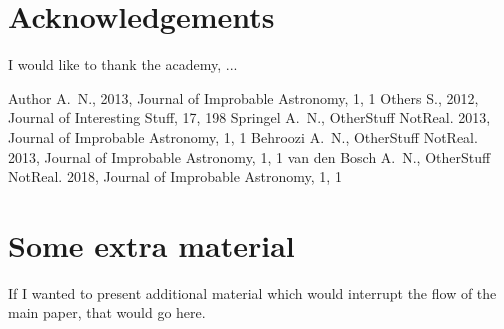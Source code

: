 \documentclass[fleqn,usenatbib]{mnras}
\begin{document}
\section*{Acknowledgements}

I would like to thank the academy, ...




%


\begin{thebibliography}{99}
Author A.~N., 2013, Journal of Improbable Astronomy, 1, 1
Others S., 2012, Journal of Interesting Stuff, 17, 198
Springel A.~N., OtherStuff NotReal. 2013, Journal of Improbable Astronomy, 1, 1
Behroozi A.~N., OtherStuff NotReal. 2013, Journal of Improbable Astronomy, 1, 1
van den Bosch A.~N., OtherStuff NotReal. 2018, Journal of Improbable Astronomy, 1, 1
\end{thebibliography}



\appendix

\section{Some extra material}

If I wanted to present additional material which would interrupt the flow of the main paper, that would go here.



\bsp	%
\label{lastpage}
\end{document}
